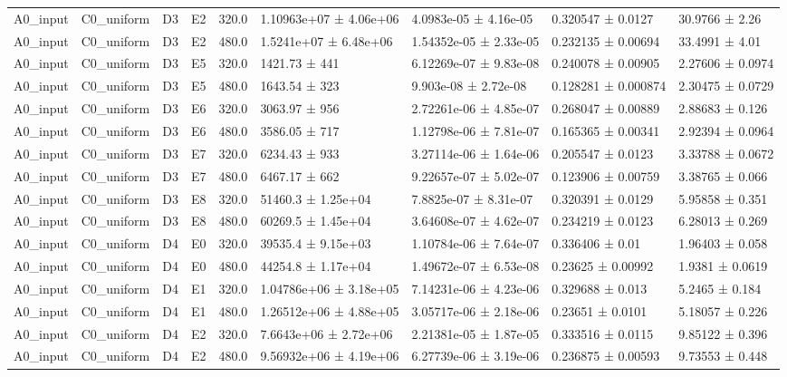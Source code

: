 \begin{table}
\begin{tabular}{lllllllll}
A0\_input & C0\_uniform & D3 & E2 & 320.0 & 1.10963e+07 ± 4.06e+06 & 4.0983e-05 ± 4.16e-05 & 0.320547 ± 0.0127 & 30.9766 ± 2.26 \\
A0\_input & C0\_uniform & D3 & E2 & 480.0 & 1.5241e+07 ± 6.48e+06 & 1.54352e-05 ± 2.33e-05 & 0.232135 ± 0.00694 & 33.4991 ± 4.01 \\
A0\_input & C0\_uniform & D3 & E5 & 320.0 & 1421.73 ± 441 & 6.12269e-07 ± 9.83e-08 & 0.240078 ± 0.00905 & 2.27606 ± 0.0974 \\
A0\_input & C0\_uniform & D3 & E5 & 480.0 & 1643.54 ± 323 & 9.903e-08 ± 2.72e-08 & 0.128281 ± 0.000874 & 2.30475 ± 0.0729 \\
A0\_input & C0\_uniform & D3 & E6 & 320.0 & 3063.97 ± 956 & 2.72261e-06 ± 4.85e-07 & 0.268047 ± 0.00889 & 2.88683 ± 0.126 \\
A0\_input & C0\_uniform & D3 & E6 & 480.0 & 3586.05 ± 717 & 1.12798e-06 ± 7.81e-07 & 0.165365 ± 0.00341 & 2.92394 ± 0.0964 \\
A0\_input & C0\_uniform & D3 & E7 & 320.0 & 6234.43 ± 933 & 3.27114e-06 ± 1.64e-06 & 0.205547 ± 0.0123 & 3.33788 ± 0.0672 \\
A0\_input & C0\_uniform & D3 & E7 & 480.0 & 6467.17 ± 662 & 9.22657e-07 ± 5.02e-07 & 0.123906 ± 0.00759 & 3.38765 ± 0.066 \\
A0\_input & C0\_uniform & D3 & E8 & 320.0 & 51460.3 ± 1.25e+04 & 7.8825e-07 ± 8.31e-07 & 0.320391 ± 0.0129 & 5.95858 ± 0.351 \\
A0\_input & C0\_uniform & D3 & E8 & 480.0 & 60269.5 ± 1.45e+04 & 3.64608e-07 ± 4.62e-07 & 0.234219 ± 0.0123 & 6.28013 ± 0.269 \\
A0\_input & C0\_uniform & D4 & E0 & 320.0 & 39535.4 ± 9.15e+03 & 1.10784e-06 ± 7.64e-07 & 0.336406 ± 0.01 & 1.96403 ± 0.058 \\
A0\_input & C0\_uniform & D4 & E0 & 480.0 & 44254.8 ± 1.17e+04 & 1.49672e-07 ± 6.53e-08 & 0.23625 ± 0.00992 & 1.9381 ± 0.0619 \\
A0\_input & C0\_uniform & D4 & E1 & 320.0 & 1.04786e+06 ± 3.18e+05 & 7.14231e-06 ± 4.23e-06 & 0.329688 ± 0.013 & 5.2465 ± 0.184 \\
A0\_input & C0\_uniform & D4 & E1 & 480.0 & 1.26512e+06 ± 4.88e+05 & 3.05717e-06 ± 2.18e-06 & 0.23651 ± 0.0101 & 5.18057 ± 0.226 \\
A0\_input & C0\_uniform & D4 & E2 & 320.0 & 7.6643e+06 ± 2.72e+06 & 2.21381e-05 ± 1.87e-05 & 0.333516 ± 0.0115 & 9.85122 ± 0.396 \\
A0\_input & C0\_uniform & D4 & E2 & 480.0 & 9.56932e+06 ± 4.19e+06 & 6.27739e-06 ± 3.19e-06 & 0.236875 ± 0.00593 & 9.73553 ± 0.448 \\

\end{tabular}
\end{table}
